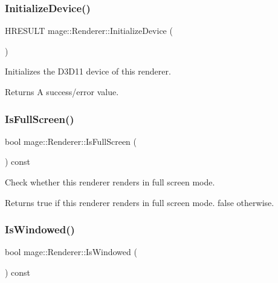 \subsubsection{\texorpdfstring{Initialize\+Device()}{InitializeDevice()}}
{\footnotesize\ttfamily H\+R\+E\+S\+U\+LT mage\+::\+Renderer\+::\+Initialize\+Device (\begin{DoxyParamCaption}{ }\end{DoxyParamCaption})\hspace{0.3cm}{\ttfamily [protected]}}

Initializes the D3\+D11 device of this renderer.

\begin{DoxyReturn}{Returns}
A success/error value. 
\end{DoxyReturn}
\hypertarget{classmage_1_1_renderer_a5ae3220e19c68f47a8e4d55e3ced4694}{}\label{classmage_1_1_renderer_a5ae3220e19c68f47a8e4d55e3ced4694} 
\subsubsection{\texorpdfstring{Is\+Full\+Screen()}{IsFullScreen()}}
{\footnotesize\ttfamily bool mage\+::\+Renderer\+::\+Is\+Full\+Screen (\begin{DoxyParamCaption}{ }\end{DoxyParamCaption}) const}

Check whether this renderer renders in full screen mode.

\begin{DoxyReturn}{Returns}
{\ttfamily true} if this renderer renders in full screen mode. {\ttfamily false} otherwise. 
\end{DoxyReturn}
\hypertarget{classmage_1_1_renderer_a1de1804c1eedae7dc12435a520a10b9c}{}\label{classmage_1_1_renderer_a1de1804c1eedae7dc12435a520a10b9c} 
\subsubsection{\texorpdfstring{Is\+Windowed()}{IsWindowed()}}
{\footnotesize\ttfamily bool mage\+::\+Renderer\+::\+Is\+Windowed (\begin{DoxyParamCaption}{ }\end{DoxyParamCaption}) const}

